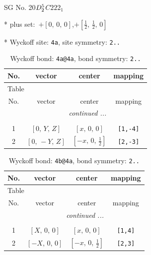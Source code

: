 \documentclass[fleqn,8pt]{jsarticle}
\begin{document}
\setcounter{MaxMatrixCols}{32}

\renewcommand{\tablename}{Table~}
\renewcommand{\figurename}{Figure~}
\begin{center}
\LARGE
SG No. 20\quad$D_{\rm 2}^{5}$\quad$C222_1$\quad[ orthorhombic ]
\end{center}

* plus set:\,\,\,$+\left[ 0,\, 0,\, 0 \right]$,\quad $+\left[ \frac{1}{2},\, \frac{1}{2},\, 0 \right]$


* Wyckoff site: {\tt 4a}, site symmetry: {\tt 2..}
\renewcommand{\arraystretch}{1.2}
\begin{longtable}{cccc}
\caption{Wyckoff bond: {\tt 4a@4a}, bond symmetry: {\tt 2..}}
 \\
 \hline \hline
No. & vector & center & mapping \\ \hline \endfirsthead

\multicolumn{3}{l}{\tablename\ \thetable{}} \\
 \hline \hline
No. & vector & center & mapping \\ \hline \endhead

 \hline \hline
\multicolumn{3}{r}{\footnotesize\it continued ...} \\ \endfoot

 \hline \hline
\multicolumn{3}{r}{} \\ \endlastfoot

1 & $\left[ 0,\, Y,\, Z \right]$ & $\left[ x,\, 0,\, 0 \right]$ & {\tt [1,-4]} \\ \hline
2 & $\left[ 0,\, - Y,\, Z \right]$ & $\left[ - x,\, 0,\, \frac{1}{2} \right]$ & {\tt [2,-3]} \\
\end{longtable}
\renewcommand{\arraystretch}{1.2}
\begin{longtable}{cccc}
\caption{Wyckoff bond: {\tt 4b@4a}, bond symmetry: {\tt 2..}}
 \\
 \hline \hline
No. & vector & center & mapping \\ \hline \endfirsthead

\multicolumn{3}{l}{\tablename\ \thetable{}} \\
 \hline \hline
No. & vector & center & mapping \\ \hline \endhead

 \hline \hline
\multicolumn{3}{r}{\footnotesize\it continued ...} \\ \endfoot

 \hline \hline
\multicolumn{3}{r}{} \\ \endlastfoot

1 & $\left[ X,\, 0,\, 0 \right]$ & $\left[ x,\, 0,\, 0 \right]$ & {\tt [1,4]} \\ \hline
2 & $\left[ - X,\, 0,\, 0 \right]$ & $\left[ - x,\, 0,\, \frac{1}{2} \right]$ & {\tt [2,3]} \\
\end{longtable}
\end{document}

